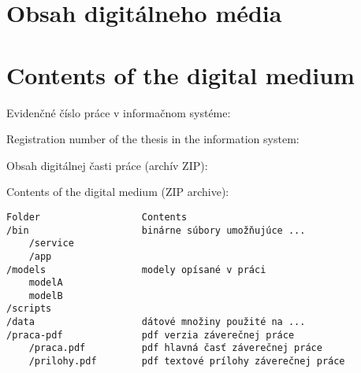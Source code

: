 \thispagestyle{empty}

\ifx\FIITlagEN\undefined
\chapter{Obsah digitálneho média}
\else
\chapter{Contents of the digital medium}
\fi

\renewcommand*{\thepage}{C-\arabic{page}}

\ifx\FIITlagEN\undefined
\par Evidenčné číslo práce v informačnom systéme: \FIITevidenceNumber
\else
\par Registration number of the thesis in the information system: \FIITevidenceNumber
\fi

\ifx\FIITlagEN\undefined
\par Obsah digitálnej časti práce (archív ZIP):
\else
\par Contents of the digital medium (ZIP archive):
\fi

\begin{verbatim}
Folder                  Contents
/bin                    binárne súbory umožňujúce ...
    /service
    /app
/models                 modely opísané v práci
    modelA
    modelB
/scripts
/data                   dátové množiny použité na ...
/praca-pdf              pdf verzia záverečnej práce
    /praca.pdf          pdf hlavná časť záverečnej práce
    /prilohy.pdf        pdf textové prílohy záverečnej práce

\end{verbatim}


